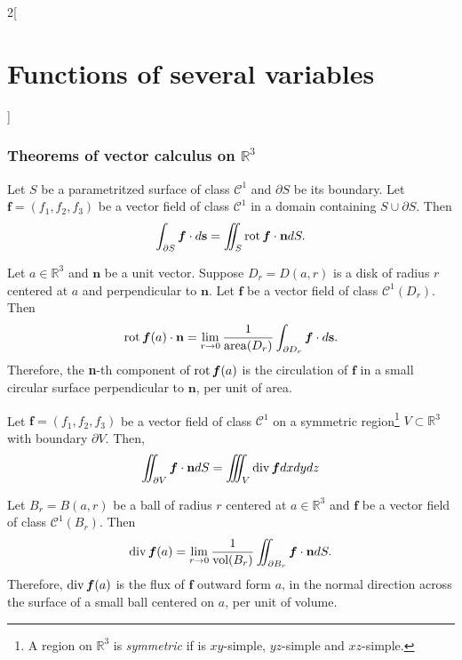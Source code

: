 \documentclass[../../../main.tex]{subfiles}
\begin{document}
\begin{multicols}{2}[\section{Functions of several variables}]
\subsubsection*{Theorems of vector calculus on \texorpdfstring{$\mathbb{R}^3$}{R3}}
\begin{theorem}
Let $S$ be a parametritzed surface of class $\mathcal{C}^1$ and $\partial S$ be its boundary. Let $\boldsymbol{f}=(f_1,f_2,f_3)$ be a vector field of class $\mathcal{C}^1$ in a domain containing $S\cup\partial S$. Then $$\int_{\partial S}\boldsymbol{f}\cdot d\textbf{s}=\iint_S\operatorname{rot}\boldsymbol{f}\cdot\textbf{n} dS.$$
\end{theorem}
\begin{corollary}
Let $a\in\mathbb{R}^3$ and $\textbf{n}$ be a unit vector. Suppose $D_r=D(a,r)$ is a disk of radius $r$ centered at $a$ and perpendicular to $\textbf{n}$. Let $\boldsymbol{f}$ be a vector field of class $\mathcal{C}^1(D_r)$. Then $$\operatorname{rot}\boldsymbol{f}(a)\cdot\textbf{n}=\lim_{r\to 0}\frac{1}{\text{area}(D_r)}\int_{\partial D_r}\boldsymbol{f}\cdot d\textbf{s}.$$ Therefore, the \textbf{n}-th component of $\operatorname{rot}\boldsymbol{f}(a)$ is the circulation of $\boldsymbol{f}$ in a small circular surface perpendicular to $\textbf{n}$, per unit of area.
\end{corollary}
\begin{theorem}
Let $\boldsymbol{f}=(f_1,f_2,f_3)$ be a vector field of class $\mathcal{C}^1$ on a symmetric region\footnote{A region on $\mathbb{R}^3$ is \textit{symmetric} if is $xy$-simple, $yz$-simple and $xz$-simple.} $V\subset\mathbb{R}^3$ with boundary $\partial V$. Then, $$\iint_{\partial V}\boldsymbol{f}\cdot\textbf{n} dS=\iiint_V\operatorname{div}\boldsymbol{f}dxdydz$$
\end{theorem}\pagebreak
\begin{corollary}
Let $B_r=B(a,r)$ be a ball of radius $r$ centered at $a\in\mathbb{R}^3$ and $\boldsymbol{f}$ be a vector field of class $\mathcal{C}^1(B_r)$. Then $$\operatorname{div}\boldsymbol{f}(a)=\lim_{r\to 0}\frac{1}{\text{vol}(B_r)}\iint_{\partial B_r}\boldsymbol{f}\cdot\textbf{n} dS.$$ Therefore, $\operatorname{div}\boldsymbol{f}(a)$ is the flux of $\boldsymbol{f}$ outward form $a$, in the normal direction across the surface of a small ball centered on $a$, per unit of volume.
\end{corollary}
\end{multicols}
\end{document}
